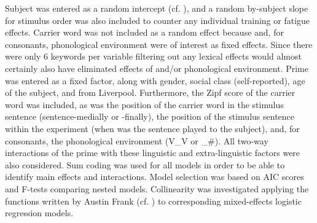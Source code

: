 Subject was entered as a random intercept (cf. ), and a random by-subject slope for stimulus order was also included to counter any individual training or fatigue effects.
Carrier word was not included as a random effect because  and, for consonants, phonological environment were of interest as fixed effects.
Since there were only 6 keywords per variable filtering out any lexical effects would almost certainly also have eliminated effects of  and/or phonological environment.
Prime was entered as a fixed factor, along with gender, social class (self-reported), age of the subject, and  from Liverpool.
Furthermore, the Zipf score of the carrier word was included, as was the position of the carrier word in the stimulus sentence (sentence-medially or -finally), the position of the stimulus sentence within the experiment (when was the sentence played to the subject), and, for consonants, the phonological environment (V\_V or \_\#).
All two-way interactions of the prime with these linguistic and extra-linguistic factors were also considered.
Sum coding was used for all models in order to be able to identify main effects and interactions.
Model selection was based on AIC scores and F-tests comparing nested models.
Collinearity was investigated applying the functions written by Austin Frank (cf. ) to corresponding mixed-effects logistic regression models.
